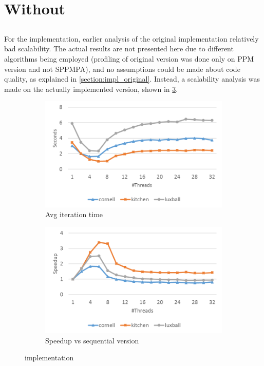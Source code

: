 \documentclass[main.tex]{subfiles}
\begin{document}
\section{Without \starpu} \label{sec:prof:cpu}

\subsection{\cpu}

For the \cpu implementation, earlier analysis of the original implementation relatively bad scalability. The actual results are not presented here due to different algorithms being employed (profiling of original version was done only on PPM version and not SPPMPA), and no assumptions could be made about code quality, as explained in \cref{section:impl_original}.
Instead, a scalability analysis was made on the actually implemented \cpu version, shown in \cref{fig:prof:cpu}.

\begin{figure}[!htp]
  \centering
  \begin{subfigure}{.5\textwidth}
    \centering
    \includegraphics[width=\linewidth]{profiling/cpu_time}
    \caption{Avg iteration time \label{fig:prof:cpu_time}}
  \end{subfigure}%
  \begin{subfigure}{.5\textwidth}
    \centering
    \includegraphics[width=\linewidth]{profiling/cpu_speedup}
    \caption{Speedup vs sequential version \label{fig:prof:cpu_speedup}}
  \end{subfigure}
  \caption{\cpu implementation \label{fig:prof:cpu}}
\end{figure}
\end{document}
